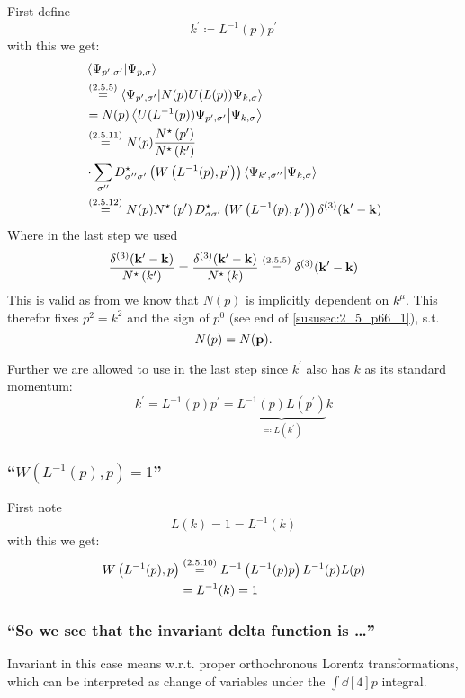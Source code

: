 First define \[k^\prime \coloneqq L^{-1}(p)p^\prime\]
with this we get:
\begin{align*} 
	&\innerproduct{\Psi_{p^\prime,\sigma^\prime}}{\Psi_{p,\sigma}}\\
	&\overset{\eqc{2.5.5}}{=}\innerproduct{\Psi_{p^\prime,\sigma^\prime}}{N(p)U(L(p))\Psi_{k,\sigma}}\\
	&=N(p)\innerproduct{U(L^{-1}(p))\Psi_{p^\prime,\sigma^\prime}}{\Psi_{k,\sigma}}\\
	&\overset{\eqc{2.5.11}}{=}N(p)\dfrac{N^\star\left(p^\prime\right)}{N^\star \left(k^\prime\right)}\\
	&\cdot\sum\limits_{\sigma^{\prime\prime}}
	D_{\sigma^{\prime\prime} \sigma^{\prime}}^\star\left(W\left(L^{-1}(p),p^\prime\right)\right)
	\innerproduct{\Psi_{k^\prime,\sigma^{\prime\prime}}}{\Psi_{k,\sigma}}\\
	&\overset{\eqc{2.5.12}}{=}N(p)N^\star\left(p^\prime\right) D_{\sigma \sigma^{\prime}}^\star\left(W\left(L^{-1}(p),p^\prime\right)\right) \delta^{(3)}(\tvec{k}^\prime- \tvec{k})
\end{align*}
Where in the last step we used 
\[\dfrac{\delta^{(3)}(\mathbf{k}^\prime- \mathbf{k})}{N^\star \left(k^\prime\right)}=\dfrac{\delta^{(3)}(\mathbf{k}^\prime- \mathbf{k})}{N^\star \left(k\right)}\overset{({2.5.5})}{=}\delta^{(3)}(\mathbf{k}^\prime- \mathbf{k})\]
This is valid as from   we know that $N(p)$ is implicitly dependent on $k^\mu$. 
This therefor fixes $p^2=k^2$ and the sign of $p^0$ (see end of \ref{sususec:2_5_p66_1}), s.t. \[N(p)=N(\mathbf{p}).\]

Further we are allowed to use  in the last step since $k^\prime$ also has  $k$ as its standard momentum:
\[k^\prime=L^{-1}(p)p^\prime=\underbrace{L^{-1}(p)L(p^\prime)}_{\eqqcolon L(k^\prime)}k\]

\subsubsection{\enquote{$W\left(L^{-1}(p),p\right)=1$} }
First note \[L(k)=1=L^{-1}(k)\]
with this we get:
\begin{align*} 
	W\left(L^{-1}(p),p\right)&\overset{({2.5.10})}{=}L^{-1}\left(L^{-1}(p)p\right)L^{-1}(p)L(p)\\
	&=L^{-1}(k)=1
\end{align*}

\subsubsection{\enquote{So we see that the \textbf{invariant delta function} is \dots} }
Invariant in this case means w.r.t. proper orthochronous Lorentz transformations, which can be interpreted as change of variables under the $\int \dd[4]{p}$ integral.

